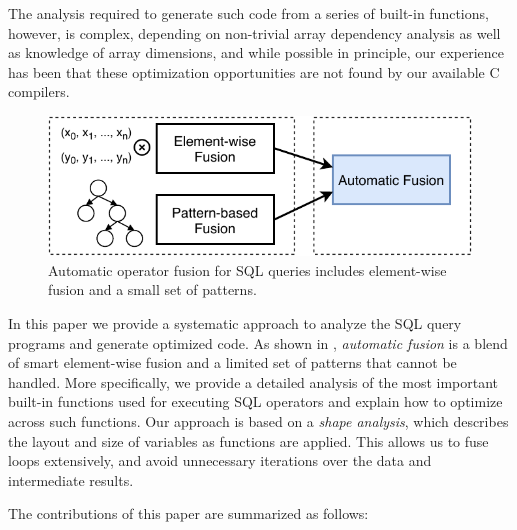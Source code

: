 
\noindent{}The analysis required to generate such code from a series of built-in functions, however, is complex,
depending on non-trivial array dependency analysis as well as knowledge of array dimensions, and 
while possible in principle, our experience has been that these optimization opportunities are not found by our available C compilers.

\begin{figure}[htbp]
\centering
\includegraphics[width=.9\columnwidth]{./src/figure/basic-idea.pdf}
\caption{Automatic operator fusion for SQL queries includes element-wise fusion and a small set of patterns.}
\label{fig:fusion_idea}
\end{figure}

In this paper we provide a systematic approach to analyze the SQL query programs
and generate optimized code. As shown in ,
\textit{automatic fusion} is a blend of smart element-wise fusion and a limited set of
patterns that cannot be handled. More specifically, we provide a detailed
analysis of the most important built-in functions used for executing SQL operators
and explain how to optimize across such functions. Our approach is based on a
\textit{shape analysis}, which describes the layout and size of variables as
functions are applied. This allows us to fuse loops extensively, and avoid unnecessary
iterations over the data and intermediate results.  

The contributions of this paper are summarized as follows:


